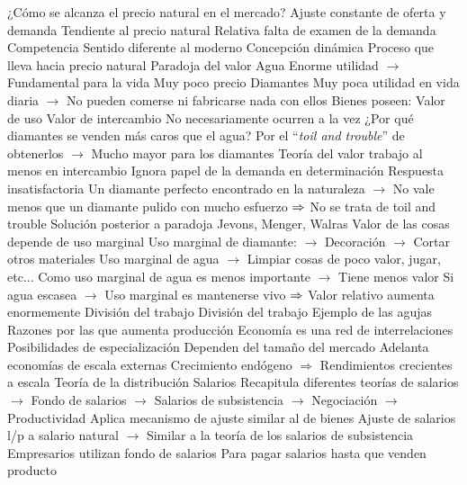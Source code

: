 \documentclass{nuevotema}
\begin{document}
\begin{esquemal}
				\4 ¿Cómo se alcanza el precio natural en el mercado?
				\4[] Ajuste constante de oferta y demanda
				\4[] Tendiente al precio natural
				\4[] Relativa falta de examen de la demanda
				\4 Competencia
				\4[] Sentido diferente al moderno
				\4[] Concepción dinámica
				\4[] Proceso que lleva hacia precio natural
			\3 Paradoja del valor
				\4 Agua
				\4[] Enorme utilidad
				\4[] $\to$ Fundamental para la vida
				\4[] Muy poco precio
				\4 Diamantes
				\4[] Muy poca utilidad en vida diaria
				\4[] $\to$ No pueden comerse ni fabricarse nada con ellos
				\4[] Bienes poseen:
				\4[] Valor de uso
				\4[] Valor de intercambio
				\4[] No necesariamente ocurren a la vez
				\4 ¿Por qué diamantes se venden más caros que el agua?
				\4[] Por el ``\textit{toil and trouble}'' de obtenerlos
				\4[] $\to$ Mucho mayor para los diamantes
				\4[$\then$] Teoría del valor trabajo al menos en intercambio
				\4[$\then$] Ignora papel de la demanda en determinación
				\4 Respuesta insatisfactoria
				\4[] Un diamante perfecto encontrado en la naturaleza
				\4[] $\to$ No vale menos que un diamante pulido con mucho esfuerzo
				\4[] $\then$ No se trata de toil and trouble
				\4 Solución posterior a paradoja
				\4[] Jevons, Menger, Walras
				\4[] Valor de las cosas depende de uso marginal
				\4[] Uso marginal de diamante:
				\4[] $\to$ Decoración
				\4[] $\to$ Cortar otros materiales
				\4[] Uso marginal de agua
				\4[] $\to$ Limpiar cosas de poco valor, jugar, etc...
				\4[] Como uso marginal de agua es menos importante
				\4[] $\to$ Tiene menos valor
				\4[] Si agua escasea
				\4[] $\to$ Uso marginal es mantenerse vivo
				\4[] $\then$ Valor relativo aumenta enormemente
			\3 División del trabajo
				\4 División del trabajo
				\4[] Ejemplo de las agujas
				\4[] Razones por las que aumenta producción
				\4[] Economía es una red de interrelaciones
				\4 Posibilidades de especialización
				\4[] Dependen del tamaño del mercado
				\4[] Adelanta economías de escala externas
				\4[] Crecimiento endógeno
				\4[] $\Rightarrow$ Rendimientos crecientes a escala
		\2 Teoría de la distribución
			\3 Salarios
				\4 Recapitula diferentes teorías de salarios
				\4[] $\to$ Fondo de salarios
				\4[] $\to$ Salarios de subsistencia
				\4[] $\to$ Negociación
				\4[] $\to$ Productividad
				\4 Aplica mecanismo de ajuste similar al de bienes
				\4[] Ajuste de salarios l/p a salario natural
				\4[] $\to$ Similar a la teoría de los salarios de subsistencia
				\4[] Empresarios utilizan fondo de salarios
				\4[] Para pagar salarios hasta que venden producto

\end{esquemal}
\end{document}
